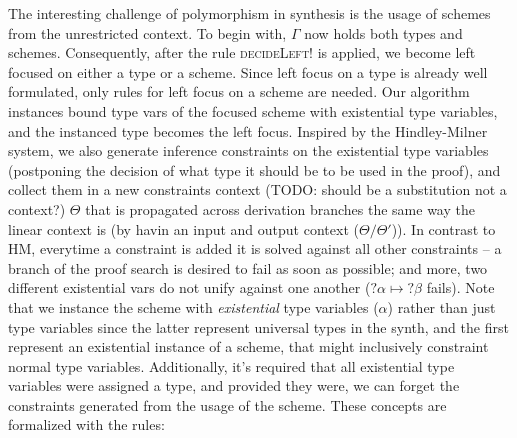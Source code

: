 \documentclass{llncs}
\def\Rho{P}
\begin{document}
The interesting challenge of polymorphism in synthesis is the usage of schemes
from the unrestricted context.  To begin with, $\Gamma$ now holds both types and
schemes. Consequently, after the rule \textsc{decideLeft!} is applied, we become
left focused on either a type or a scheme. Since left focus on a type is already
well formulated, only rules for left focus on a scheme are needed. Our algorithm
instances bound type vars of the focused scheme with existential type variables,
and the instanced type becomes the left focus. Inspired by the Hindley-Milner
system, we also generate inference constraints on the existential type variables
(postponing the decision of what type it should be to be used in the proof), and
collect them in a new constraints context (TODO: should be a substitution not a
context?) $\Theta$ that is propagated across derivation branches the same way
the linear context is (by havin an input and output context ($\Theta/\Theta'$)).
In contrast to HM, everytime a constraint is added it is solved against all
other constraints -- a branch of the proof search is desired to fail as soon as
possible; and more, two different existential vars do not unify against
one another ($?\alpha \mapsto ?\beta$ fails). Note that we instance the scheme with \emph{existential} type
variables ($\alpha$) rather than just type variables since the latter represent
universal types in the synth, and the first represent an existential instance of
a scheme, that might inclusively constraint normal type variables. Additionally,
it's required that all existential type variables were assigned a type, and
provided they were, we can forget the constraints generated from the usage of
the scheme. These concepts are formalized with the rules:
\end{document}
